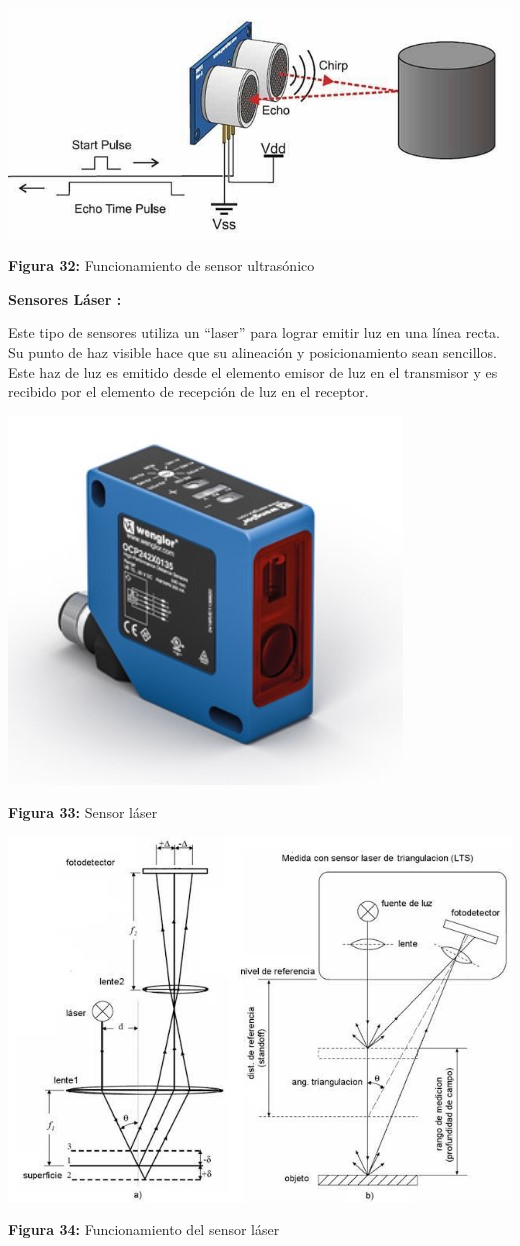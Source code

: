 \vspace{5mm} %

\begin{center}
	\includegraphics[width=0.5\linewidth]{img/Sultrasonicos}
	
	\vspace{2mm} %
	
	\textbf{Figura 32:} Funcionamiento de sensor ultrasónico
\end{center}



\vspace{10mm}
\textbf{Sensores Láser : }

Este tipo de sensores utiliza un “laser” para lograr emitir luz en una línea recta. Su punto de haz visible hace que su alineación y posicionamiento sean sencillos. Este haz de luz es emitido desde el elemento emisor de luz en el transmisor y es recibido por el elemento de recepción de luz en el receptor. 
\vspace{5mm}

\begin{center}
	\includegraphics[width=0.4\linewidth, height=0.2\textwidth]{img/laser}
	
	\vspace{2mm} %
	
	\textbf{Figura 33:} Sensor láser
\end{center}

\vspace{5mm} %

\begin{center}
	\includegraphics[width=0.4\linewidth]{img/Slaser}
	
	\vspace{2mm} %
	
	\textbf{Figura 34:} Funcionamiento del sensor láser
\end{center}

